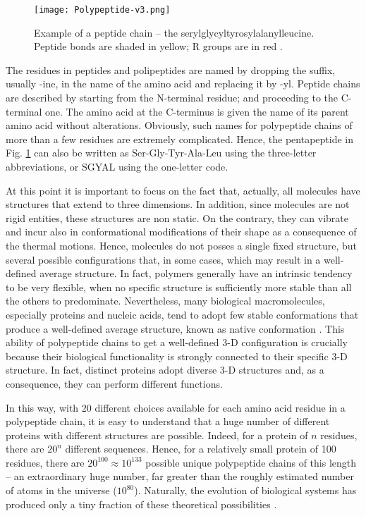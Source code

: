 \begin{figure}[h]
\centering
\begin{minipage}[t]{0.81\textwidth}
\centering
\texttt{[image: Polypeptide-v3.png]}

\caption{\small{Example of a peptide chain -- the serylglycyltyrosylalanylleucine. Peptide bonds are shaded in yellow; R groups are in red
\cite{nelson2008lehninger}.}}

\label{fig:PentaPeptide}
\end{minipage} 
\end{figure}

The residues in peptides and polipeptides are named by dropping the suffix, usually -ine, in the name of the amino acid and replacing it by -yl. Peptide chains are described by starting from the N-terminal residue;  and proceeding to the C-terminal one. The amino acid at the C-terminus is given the name of its parent amino acid without alterations. Obviously, such names for polypeptide chains of more than a few residues are extremely complicated. Hence, the pentapeptide in Fig. \ref{fig:PentaPeptide} can also be written as Ser-Gly-Tyr-Ala-Leu using the three-letter abbreviations, or SGYAL using the one-letter code.

At this point it is important to focus on the fact that, actually, all molecules have structures that extend to three dimensions. In addition, since molecules are not rigid entities, these structures are non static. On the contrary, they can vibrate and incur also in conformational modifications of their shape as a consequence of the thermal motions. Hence, molecules do not posses a single fixed structure, but several possible configurations that, in some cases, which may result in a well-defined average structure.
In fact, polymers generally have an intrinsic tendency to be very flexible, when no specific structure is sufficiently more stable than all the others to predominate. Nevertheless, many biological macromolecules, especially proteins and nucleic acids, tend to adopt few stable conformations that produce a well-defined average structure, known as native conformation
\cite{nelson2008lehninger}. This ability of polypeptide chains to get a well-defined 3-D configuration is crucially because their biological functionality is strongly connected to their specific 3-D structure. In fact, distinct proteins adopt diverse 3-D structures and, as a consequence, they can perform different functions. 

In this way, with 20 different choices available for each amino acid residue in a polypeptide chain, it is easy to understand that a huge number of different proteins with different structures are possible. Indeed, for a protein of $n$ residues, there are $20^n$ different sequences. Hence, for a relatively small protein of 100 residues, there are $20^{100} \approx 10^{133}$ possible unique polypeptide chains of this length -- an extraordinary huge number, far greater than the roughly estimated number of atoms in the universe ($10^{80}$). Naturally, the evolution of biological systems has produced only a tiny fraction of these theoretical possibilities \cite{creighton2010biophysical}. 

